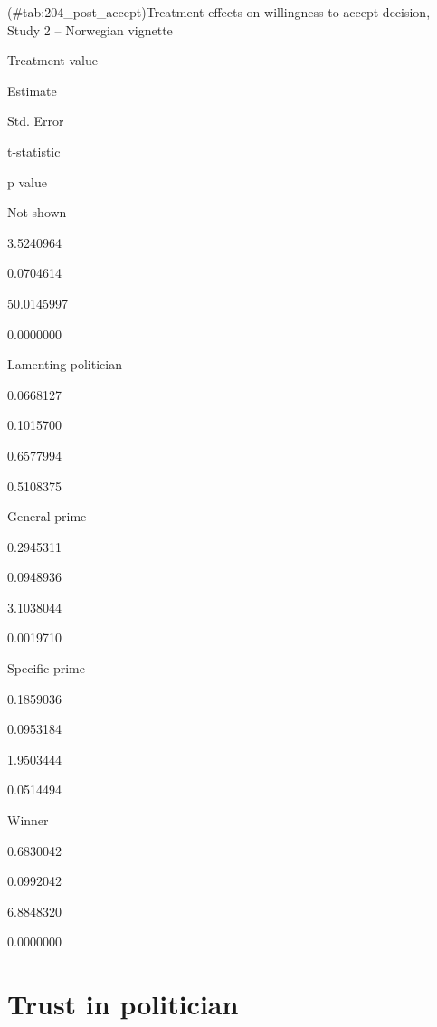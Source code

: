 \documentclass[]{book}
\begin{document}
(\#tab:204\_post\_accept)Treatment effects on willingness to accept
decision, Study 2 -- Norwegian vignette

Treatment value

Estimate

Std. Error

t-statistic

p value

Not shown

3.5240964

0.0704614

50.0145997

0.0000000

Lamenting politician

0.0668127

0.1015700

0.6577994

0.5108375

General prime

0.2945311

0.0948936

3.1038044

0.0019710

Specific prime

0.1859036

0.0953184

1.9503444

0.0514494

Winner

0.6830042

0.0992042

6.8848320

0.0000000

\section{Trust in politician}\label{trust-in-politician}
\end{document}
